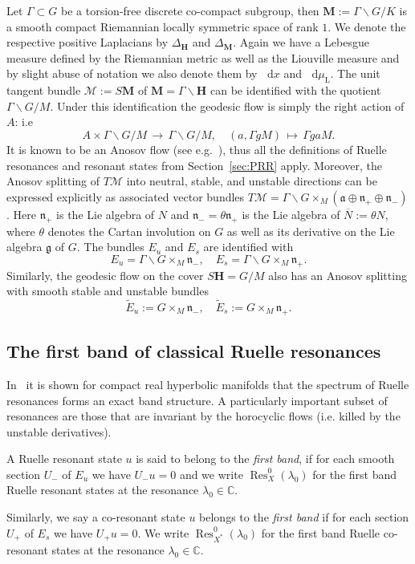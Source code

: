\documentclass[AHL, Unicode, longabstracts, published]{cedram}
\DeclareMathOperator{\Res}{Res}
\newcommand{\rml}{\mathrm{L}}
\newcommand{\mc}{\mathcal}
\newcommand{\cc}{\mathbb{C}}
\newcommand{\bfh}{\mathbf{H}}
\newcommand{\bfm}{\mathbf{M}}
\newcommand{\x}{\times}
\newcommand{\til}{\widetilde}
\newcommand{\intd}{\mathop{}\!\mathrm{d}}
\begin{document}
Let $\Gamma\subset G$ be a torsion-free discrete co-compact subgroup, then $\textbf{M}:=\Gamma\backslash G/K$ is a smooth compact Riemannian locally symmetric space of rank $1$. We denote the respective positive Laplacians by $\Delta_{\mathbf{H}}$ and $\Delta_{\textbf{M}}$. Again we have a Lebesgue measure defined by the Riemannian metric as well as the Liouville measure and by slight abuse of notation we also denote them by $\intd x$ and $\intd \mu_{\rml}$. The unit tangent bundle $\mc{M}:=S{\bfm}$ of ${\bfm}=\Gamma\backslash {\bfh}$ can be identified with the quotient $\Gamma\backslash G/M$. Under this identification the geodesic flow is simply the right action of $A$: i.e
\[
A \x \Gamma\backslash G/M\,\to\,\Gamma\backslash G/M, \quad (a, \Gamma gM)\,\mapsto\,\Gamma gaM.
\]
It is known to be an Anosov flow (see e.g.~\cite{Hi05}), thus all the definitions of Ruelle resonances and resonant states from Section~\ref{sec:PRR} apply. Moreover, the Anosov splitting of $T\mc{M}$ into neutral, stable, and unstable directions can be expressed explicitly as associated vector bundles $T\mc{M}=\Gamma\backslash G\times_M(\mathfrak a\oplus\mathfrak n_+\oplus \mathfrak n_-)$. Here $\mathfrak n_+$ is the Lie algebra of $N$ and $\mathfrak n_-=\theta\mathfrak n_+$ is the Lie algebra of $\overline{N}:=\theta N$, where $\theta$ denotes the Cartan involution on $G$ as well as its derivative on the Lie algebra $\mathfrak g$ of $G$. The bundles $E_u$ and $E_s$ are identified with
\[
E_u=\Gamma\backslash G\times_M \mathfrak n_-, \quad E_s=\Gamma\backslash G\times_M \mathfrak n_+.
\]
Similarly, the geodesic flow on the cover $S{\bfh}=G/M$ also has an Anosov splitting with smooth stable and unstable bundles
\[
\til{E}_u:=G\times_M \mathfrak n_-, \quad \til{E}_s:=G\times_M \mathfrak n_+.
\]

\subsection{The first band of classical Ruelle resonances}\label{sec:firstband}
In~\cite{DFG15} it is shown for compact real hyperbolic manifolds that the spectrum of Ruelle resonances forms an exact band structure. A particularly important subset of resonances are those that are invariant by the horocyclic flows (i.e. killed by the unstable derivatives).

\begin{defi}\label{def:firstBand}
A Ruelle resonant state $u$ is said to belong to the
\emph{first band}, if for each smooth section $U_-$ of $E_u$ we have $U_- u =0$ and we write ${\Res}_X^0(\lambda_0)$ for the first band Ruelle resonant states at the resonance $\lambda_0\in \cc$.

Similarly, we say a co-resonant state $u$ belongs to the
\emph{first band} if for each section $U_+$ of $E_s$ we have $U_+u =0$. We write $ \Res^0_{X^*}(\lambda_0)$ for the first band Ruelle co-resonant states at the resonance $\lambda_0\in \cc$.
\end{defi}
\end{document}
